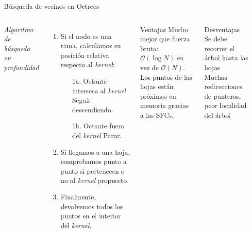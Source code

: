 \documentclass[aspectratio=169]{beamer}
\begin{document}
\begin{frame}{Búsqueda de vecinos en Octrees}
    \begin{columns}
    \textit{Algoritmo de búsqueda en profundidad}
    \vspace{1em}
        \begin{enumerate}
            \item Si el nodo es una rama, calculamos su posición relativa respecto al \textit{kernel}:
            \begin{enumerate}
                \item[1a.] Octante interseca al \textit{kernel} \textrightarrow\: Seguir descendiendo.
                \item[1b.] Octante fuera del \textit{kernel} \textrightarrow\:  Parar.
            \end{enumerate}
            \item Si llegamos a una hoja, comprobamos punto a punto si pertenecen o no al \textit{kernel} propuesto. 
            \item Finalmente, devolvemos todos los puntos en el interior del \textit{kernel}.
        \end{enumerate}
        \begin{exampleblock}{Ventajas}
            \textrightarrow \: Mucho mejor que fuerza bruta: $\mathcal{O}(\log{N})$ en vez de $\mathcal{O}(N)$. \\
            \textrightarrow \: Los puntos de las hojas están próximos en memoria gracias a las SFCs. \\
        \end{exampleblock}
        \begin{alertblock}{Desventajas}
            \textrightarrow \: Se debe recorrer el árbol hasta las hojas \\
            \textrightarrow \: Muchas redirecciones de punteros, peor localidad del árbol \\
        \end{alertblock}
    \end{columns}
\end{frame}
\end{document}
